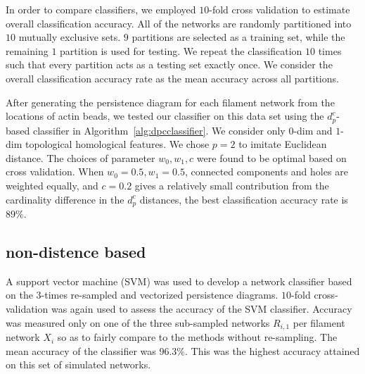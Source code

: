 \documentclass[10pt]{article}
\begin{document}
In order to compare classifiers, we employed $10$-fold cross validation to estimate overall classification accuracy. All of the networks are randomly partitioned into $10$ mutually exclusive sets. $9$ partitions are selected as a training set, while the remaining $1$ partition is used for testing. We repeat the classification $10$ times such that every partition acts as a testing set exactly once. We consider the overall classification accuracy rate as the mean accuracy across all partitions.

After generating the persistence diagram for each filament network from the locations of actin beads, we tested our classifier on this data set using the $d^c_p$-based classifier in Algorithm~\ref{alg:dpcclassifier}. We consider only $0$-dim and $1$-dim topological homological features. We chose $p=2$ to imitate Euclidean distance. The choices of parameter $w_0, w_1, c$ were found to be optimal based on cross validation. When $w_0=0.5, w_1=0.5$, connected components and holes are weighted equally, and $c=0.2$ gives a relatively small contribution from the cardinality difference in the $d^c_p$ distances, the best classification accuracy rate is $89\%$.

\subsection{non-distence based}

A support vector machine (SVM) was used to develop a network classifier based on the 3-times re-sampled and vectorized persistence diagrams. $10$-fold cross-validation was again used to assess the accuracy of the SVM classifier. Accuracy was measured only on one of the three sub-sampled networks $R_{i,1}$ per filament network $X_i$ so as to fairly compare to the methods without re-sampling. The mean accuracy of the classifier was 96.3\%. This was the highest accuracy attained on this set of simulated networks.
\end{document}
